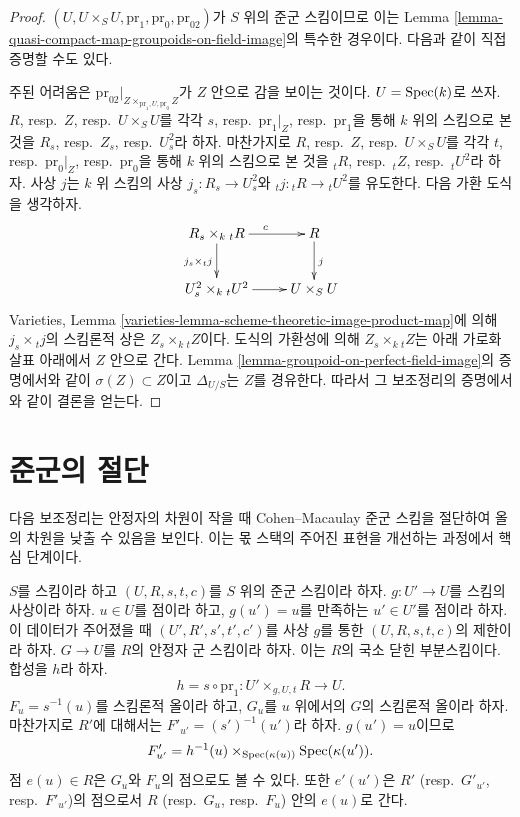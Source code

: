 \begin{proof}
$(U, U \times_S U, \text{pr}_1, \text{pr}_0, \text{pr}_{02})$가
$S$ 위의 준군 스킴이므로 이는 Lemma
\ref{lemma-quasi-compact-map-groupoids-on-field-image}의 특수한 경우이다.
다음과 같이 직접 증명할 수도 있다.

\medskip\noindent
주된 어려움은 $\text{pr}_{02}|_{Z \times_{\text{pr}_1, U, \text{pr}_0} Z}$가
$Z$ 안으로 감을 보이는 것이다. $U = \mathop{\mathrm{Spec}}(k)$로 쓰자.
$R$, resp.\ $Z$, resp.\ $U \times_S U$를 각각 $s$, resp.\ $\text{pr}_1|_Z$,
resp.\ $\text{pr}_1$을 통해 $k$ 위의 스킴으로 본 것을
$R_s$, resp.\ $Z_s$, resp.\ $U^2_s$라 하자. 마찬가지로
$R$, resp.\ $Z$, resp.\ $U \times_S U$를 각각 $t$, resp.\ $\text{pr}_0|_Z$,
resp.\ $\text{pr}_0$을 통해 $k$ 위의 스킴으로 본 것을
${}_tR$, resp.\ ${}_tZ$, resp.\ ${}_tU^2$라 하자. 사상 $j$는 $k$ 위
스킴의 사상 $j_s : R_s \to U^2_s$와 ${}_tj : {}_tR \to {}_tU^2$를 유도한다.
다음 가환 도식을 생각하자.
$$
\xymatrix{
R_s \times_k {}_tR \ar[r]^c \ar[d]_{j_s \times {}_tj} &  R \ar[d]^j \\
U^2_s \times_k {}_tU^2 \ar[r] & U \times_S U
}
$$
Varieties, Lemma \ref{varieties-lemma-scheme-theoretic-image-product-map}에 의해
$j_s \times {}_tj$의 스킴론적 상은 $Z_s \times_k {}_tZ$이다.
도식의 가환성에 의해 $Z_s \times_k {}_tZ$는 아래 가로화살표 아래에서
$Z$ 안으로 간다. Lemma \ref{lemma-groupoid-on-perfect-field-image}의
증명에서와 같이 $\sigma(Z) \subset Z$이고 $\Delta_{U/S}$는 $Z$를 경유한다.
따라서 그 보조정리의 증명에서와 같이 결론을 얻는다.
\end{proof}







\section{준군의 절단}
\label{section-slicing}

\noindent
다음 보조정리는 안정자의 차원이 작을 때 Cohen--Macaulay 준군 스킴을
절단하여 올의 차원을 낮출 수 있음을 보인다. 이는 몫 스택의 주어진 표현을
개선하는 과정에서 핵심 단계이다.

\begin{situation}
\label{situation-slice}
$S$를 스킴이라 하고 $(U, R, s, t, c)$를 $S$ 위의 준군 스킴이라 하자.
$g : U' \to U$를 스킴의 사상이라 하자. $u \in U$를 점이라 하고,
$g(u') = u$를 만족하는 $u' \in U'$를 점이라 하자. 이 데이터가 주어졌을 때
$(U', R', s', t', c')$를 사상 $g$를 통한 $(U, R, s, t, c)$의 제한이라 하자.
$G \to U$를 $R$의 안정자 군 스킴이라 하자. 이는 $R$의 국소 닫힌
부분스킴이다. 합성을 $h$라 하자.
$$
h = s \circ \text{pr}_1 : U' \times_{g, U, t} R \longrightarrow U.
$$
$F_u = s^{-1}(u)$를 스킴론적 올이라 하고, $G_u$를 $u$ 위에서의 $G$의
스킴론적 올이라 하자. 마찬가지로 $R'$에 대해서는
$F'_{u'} = (s')^{-1}(u')$라 하자. $g(u') = u$이므로
$$
F'_{u'} = h^{-1}(u) \times_{\mathop{\mathrm{Spec}}(\kappa(u))} \mathop{\mathrm{Spec}}(\kappa(u')).
$$
점 $e(u) \in R$은 $G_u$와 $F_u$의 점으로도 볼 수 있다. 또한
$e'(u')$은 $R'$ (resp.\ $G'_{u'}$, resp.\ $F'_{u'}$)의 점으로서
$R$ (resp.\ $G_u$, resp.\ $F_u$) 안의 $e(u)$로 간다.
\end{situation}

